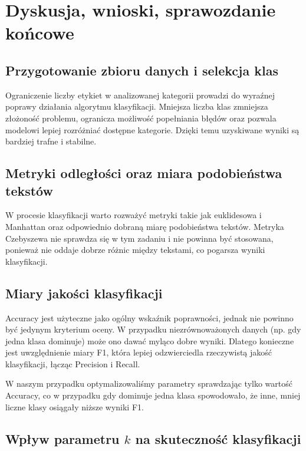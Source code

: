 \documentclass{article}
\begin{document}
\newpage
		
	\section{Dyskusja, wnioski, sprawozdanie końcowe}

	\subsection{Przygotowanie zbioru danych i selekcja klas}

	Ograniczenie liczby etykiet w analizowanej kategorii prowadzi do wyraźnej poprawy działania algorytmu klasyfikacji. Mniejsza liczba klas zmniejsza złożoność problemu, ogranicza możliwość popełniania błędów oraz pozwala modelowi lepiej rozróżniać dostępne kategorie. Dzięki temu uzyskiwane wyniki są bardziej trafne i stabilne.

	\subsection{Metryki odległości oraz miara podobieństwa tekstów}

	W procesie klasyfikacji warto rozważyć metryki takie jak euklidesowa i Manhattan oraz odpowiednio dobraną miarę podobieństwa tekstów. Metryka Czebyszewa nie sprawdza się w tym zadaniu i nie powinna być stosowana, ponieważ nie oddaje dobrze różnic między tekstami, co pogarsza wyniki klasyfikacji.
	
	\subsection{Miary jakości klasyfikacji}

	Accuracy jest użyteczne jako ogólny wskaźnik poprawności, jednak nie powinno być jedynym kryterium oceny. W przypadku niezrównoważonych danych (np. gdy jedna klasa dominuje) może ono dawać myląco dobre wyniki. Dlatego konieczne jest uwzględnienie miary F1, która lepiej odzwierciedla rzeczywistą jakość klasyfikacji, łącząc Precision i Recall.

	W naszym przypadku optymalizowaliśmy parametry sprawdzając tylko wartość Accuracy, co w przypadku gdy dominuje jedna klasa spowodowało, że inne, mniej liczne klasy osiągały niższe wyniki F1. 
		
	\subsection{Wpływ parametru $k$ na skuteczność klasyfikacji}
\end{document}
